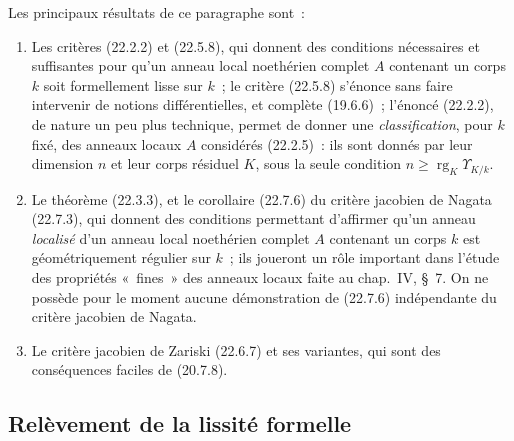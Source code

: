 \documentclass[10pt,oneside]{book}
\newcommand{\oldpage}[2][]{%
  \setcounter{footnote}{0}%
  \marginpar{\scriptsize\textbf{#1}~|~#2}\ignorespaces}
\begin{document}
Les principaux résultats de ce paragraphe sont~:
\begin{enumerate}
  \item[a)] Les critères (22.2.2) et (22.5.8), qui donnent des conditions
  nécessaires et suffisantes pour qu'un anneau local noethérien complet $A$
  contenant un corps $k$ soit formellement lisse sur $k$~; le critère
  (22.5.8) s'énonce sans faire intervenir de notions différentielles, et
  complète (19.6.6)~; l'énoncé (22.2.2), de nature un peu plus technique,
  permet de donner une \emph{classification}, pour $k$ fixé, des anneaux
  locaux $A$ considérés (22.2.5)~: ils sont donnés par leur dimension $n$ et
  leur corps résiduel $K$, sous la seule condition
  $n\geqslant\operatorname{rg}_K\Upsilon_{K/k}$.

  \item[b)] Le théorème (22.3.3), et le corollaire (22.7.6) du critère
  jacobien de Nagata (22.7.3), qui donnent des conditions permettant
  d'affirmer qu'un anneau \emph{localisé} d'un anneau local noethérien complet
  $A$ contenant un corps $k$ est géométriquement régulier sur $k$~; ils
  joueront un rôle important dans l'étude des propriétés «~fines~» des
  anneaux locaux faite au chap.~IV, §~7. On ne possède pour le moment aucune
  démonstration de (22.7.6) indépendante du critère jacobien de Nagata.

  \item[c)] Le critère jacobien de Zariski (22.6.7) et ses variantes, qui
  sont des conséquences faciles de (20.7.8).
\end{enumerate}

\oldpage[0\textsubscript{IV-1}]{183}

\subsection{Relèvement de la lissité formelle}
\label{subsection:0.22.1-fr}
\end{document}
